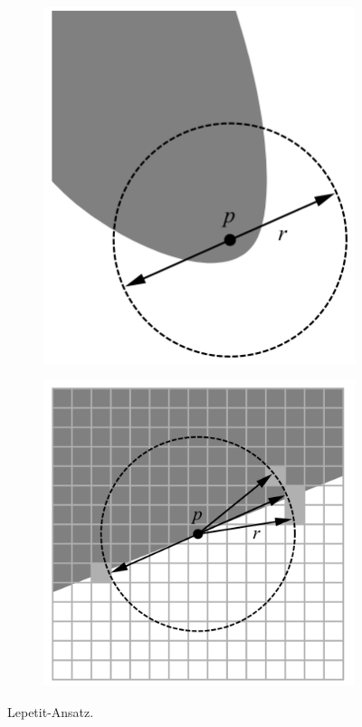 \documentclass[11pt]{article}
\begin{document}
\begin{figure}[h!]
    \centering
    \begin{subfigure}[c]{0.3\textwidth}
        \includegraphics[width=\linewidth]{images/lepetit1.png}
    \end{subfigure}%
    \begin{subfigure}[c]{0.3\textwidth}
        \includegraphics[width=\linewidth]{images/lepetit2.png}
    \end{subfigure}
    \caption{Lepetit-Ansatz.}
    \label{fig:lepetit}
\end{figure}
\end{document}
